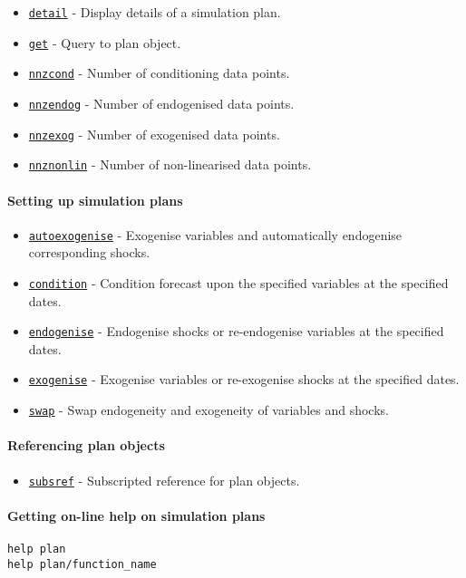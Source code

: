 \begin{itemize}
\itemsep1pt\parskip0pt
\item
  \href{plan/detail}{\texttt{detail}} - Display details of a simulation
  plan.
\item
  \href{plan/get}{\texttt{get}} - Query to plan object.
\item
  \href{plan/nnzcond}{\texttt{nnzcond}} - Number of conditioning data
  points.
\item
  \href{plan/nnzendog}{\texttt{nnzendog}} - Number of endogenised data
  points.
\item
  \href{plan/nnzexog}{\texttt{nnzexog}} - Number of exogenised data
  points.
\item
  \href{plan/nnznonlin}{\texttt{nnznonlin}} - Number of non-linearised
  data points.
\end{itemize}

\paragraph{Setting up simulation
plans}\label{setting-up-simulation-plans}

\begin{itemize}
\itemsep1pt\parskip0pt
\item
  \href{plan/autoexogenise}{\texttt{autoexogenise}} - Exogenise
  variables and automatically endogenise corresponding shocks.
\item
  \href{plan/condition}{\texttt{condition}} - Condition forecast upon
  the specified variables at the specified dates.
\item
  \href{plan/endogenise}{\texttt{endogenise}} - Endogenise shocks or
  re-endogenise variables at the specified dates.
\item
  \href{plan/exogenise}{\texttt{exogenise}} - Exogenise variables or
  re-exogenise shocks at the specified dates.
\item
  \href{plan/swap}{\texttt{swap}} - Swap endogeneity and exogeneity of
  variables and shocks.
\end{itemize}

\paragraph{Referencing plan objects}\label{referencing-plan-objects}

\begin{itemize}
\itemsep1pt\parskip0pt
\item
  \href{plan/subsref}{\texttt{subsref}} - Subscripted reference for plan
  objects.
\end{itemize}

\paragraph{Getting on-line help on simulation
plans}\label{getting-on-line-help-on-simulation-plans}

\begin{verbatim}
help plan
help plan/function_name
\end{verbatim}



